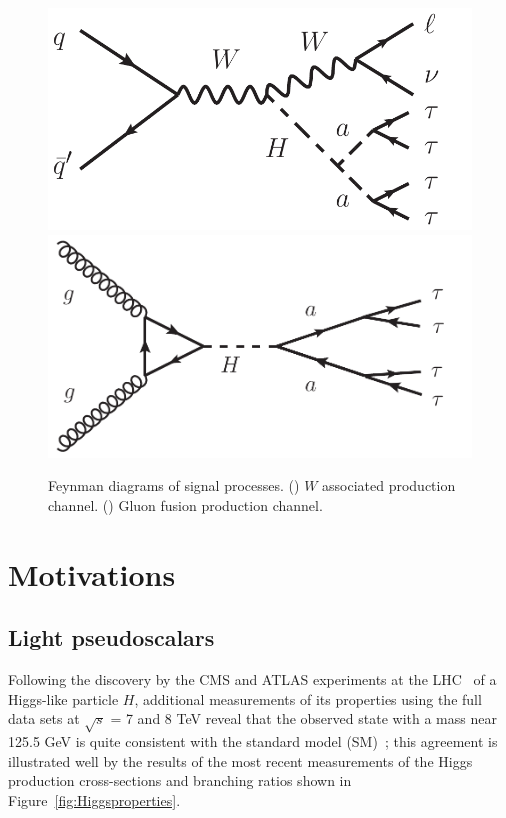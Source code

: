 \begin{figure}[hbtp]
  \begin{center}
    \includegraphics[width=\cmsFigWidth]{figures/FeynWH_ellnu4tau}
    \includegraphics[width=\cmsFigWidth]{figures/FeynggH_aa_4tau}
    \caption{Feynman diagrams of signal processes. (\cmsLeft) $W$ associated production channel. (\cmsRight) Gluon fusion production channel.}
    \label{fig:signatures}
  \end{center}
\end{figure}

\section{Motivations\label{sec:motivations}}

\subsection{Light pseudoscalars\label{sec:lighta}}

Following the discovery by the CMS and ATLAS experiments at the LHC~\cite{Aad:2012tfa,Chatrchyan:2012ufa} of a Higgs-like particle $H$, additional measurements of its properties using the full data sets at $\sqrt{s}$ = 7 and 8 TeV reveal that the observed state with a mass near 125.5 GeV is quite consistent with the standard model (SM)~\cite{ATLASnew,CMS:new,Aad:2013wqa}; this agreement is illustrated well by the results of the most recent measurements of the Higgs production cross-sections and branching ratios shown in Figure~\ref{fig:Higgsproperties}.

